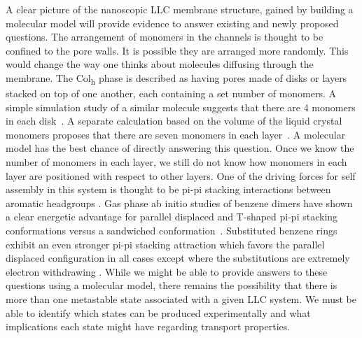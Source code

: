 A clear picture of the nanoscopic LLC membrane structure, gained by building 
a molecular model will provide evidence to answer existing and newly proposed
questions.
The arrangement of monomers
in the channels is thought to be confined to the pore walls. It is 
possible they are arranged more randomly. This would change the way
one thinks about molecules diffusing through the membrane. The
Col\textsubscript{h} phase is described as having pores made of disks or
layers stacked
on top of one another, each containing a set number of monomers. A 
simple simulation study of a similar molecule suggests that there are 4
monomers in each disk~\cite{zhu_methacrylated_2006}. A separate calculation
based on the volume of the liquid crystal monomers proposes that there 
are seven monomers in each layer~\cite{resel_structural_2000}. 
A molecular model has the best chance of directly answering this question.
Once we know the number of monomers in each layer, we still do not know how 
monomers in each layer are positioned with respect to other layers. 
One of the driving forces for self %
assembly in this system is thought to be pi-pi stacking interactions
between aromatic headgroups \cite{gazit_possible_2002}. Gas phase ab
initio studies of benzene dimers have shown a clear energetic advantage
for parallel displaced and T-shaped pi-pi stacking conformations versus a
sandwiched conformation~\cite{sinnokrot_estimates_2002}.
Substituted benzene rings exhibit an even stronger pi-pi stacking 
attraction which favors the parallel displaced configuration in all cases
except where the substitutions are extremely electron withdrawing
\cite{waller_hybrid_2006,ringer_effect_2006}. While we might be able to
provide answers to these questions using a molecular model, there remains
the possibility that there is more than one metastable state associated
with a given LLC system. We must be able to identify which states can
be produced experimentally and what implications each state might have
regarding transport properties.

